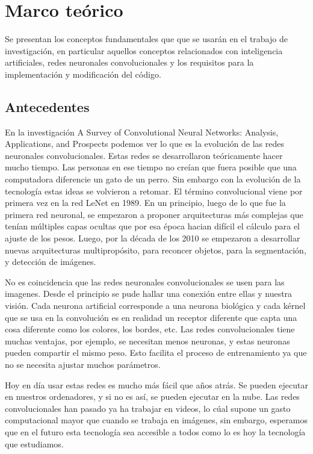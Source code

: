 \documentclass[../main.tex]{subfiles}
\begin{document}
\section{Marco teórico}

Se presentan los conceptos fundamentales que que se usarán en el trabajo de investigación, en particular aquellos conceptos relacionados con inteligencia artificiales, redes neuronales convolucionales y los requisitos para la implementación y modificación del código.

\subsection{Antecedentes}

En la investigación A Survey of Convolutional Neural Networks: Analysis, Applications, and Prospects \cite{li2021survey} podemos ver lo que es la evolución de las redes neuronales convolucionales. Estas redes se desarrollaron teóricamente hacer mucho tiempo. Las personas en ese tiempo no creían que fuera posible que una computadora diferencie un gato de un perro. Sin embargo con la evolución de la tecnología estas ideas se volvieron a retomar. El término convolucional viene por primera vez en la red LeNet en 1989. En un principio, luego de lo que fue la primera red neuronal, se empezaron a proponer arquitecturas más complejas que tenían múltiples capas ocultas que por esa época hacian difícil el cálculo para el ajuste de los pesos. Luego, por la década de los 2010 se empezaron a desarrollar nuevas arquitecturas multipropósito, para reconcer objetos, para la segmentación, y detección de imágenes.

No es coincidencia que las redes neuronales convolucionales se usen para las imagenes. Desde el principio se pude hallar una conexión entre ellas y nuestra visión. Cada neurona artificial corresponde a una neurona biológica y cada kérnel que se usa en la convolución es en realidad un receptor diferente que capta una cosa diferente como los colores, los bordes, etc. Las redes convolucionales tiene muchas ventajas, por ejemplo, se necesitan menos neuronas, y estas neuronas pueden compartir el mismo peso. Esto facilita el proceso de entrenamiento ya que no se necesita ajustar muchos parámetros.

Hoy en día usar estas redes es mucho más fácil que años atrás. Se pueden ejecutar en nuestros ordenadores, y si no es así, se pueden ejecutar en la nube. Las redes convolucionales han pasado ya ha trabajar en videos, lo cúal supone un gasto computacional mayor que cuando se trabaja en imágenes, sin embargo, esperamos que en el futuro esta tecnología sea accesible a todos como lo es hoy la tecnología que estudiamos.
\end{document}
